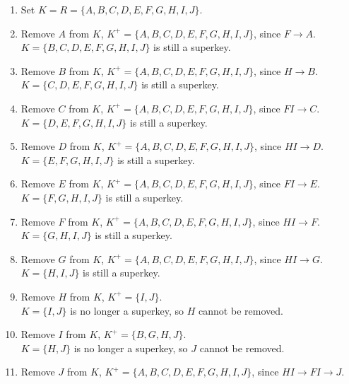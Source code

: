 \documentclass[12pt,letterpaper,titlepage,en-US]{article}
\begin{document}
\begin{homeworkProblem}
    \begin{homeworkSubProblem}
        \begin{enumerate}[label=\textbf{Step {\arabic*}}, leftmargin=2cm]
            \item Set $K = R = \{A,B,C,D,E,F,G,H,I,J\}$.
            \item Remove $A$ from $K$, $K^+ = \{A,B,C,D,E,F,G,H,I,J\}$, since $F \rightarrow A$.\\
                $K = \{B,C,D,E,F,G,H,I,J\}$ is still a superkey.
            \item Remove $B$ from $K$, $K^+ = \{A,B,C,D,E,F,G,H,I,J\}$, since $H \rightarrow B$.\\
                $K = \{C,D,E,F,G,H,I,J\}$ is still a superkey.
            \item Remove $C$ from $K$, $K^+ = \{A,B,C,D,E,F,G,H,I,J\}$, since $FI \rightarrow C$.\\
                $K = \{D,E,F,G,H,I,J\}$ is still a superkey.
            \item Remove $D$ from $K$, $K^+ = \{A,B,C,D,E,F,G,H,I,J\}$, since $HI \rightarrow D$.\\
                $K = \{E,F,G,H,I,J\}$ is still a superkey.
            \item Remove $E$ from $K$, $K^+ = \{A,B,C,D,E,F,G,H,I,J\}$, since $FI \rightarrow E$.\\
                $K = \{F,G,H,I,J\}$ is still a superkey.
            \item Remove $F$ from $K$, $K^+ = \{A,B,C,D,E,F,G,H,I,J\}$, since $HI \rightarrow F$.\\
                $K = \{G,H,I,J\}$ is still a superkey.
            \item Remove $G$ from $K$, $K^+ = \{A,B,C,D,E,F,G,H,I,J\}$, since $HI \rightarrow G$.\\
                $K = \{H,I,J\}$ is still a superkey.
            \item Remove $H$ from $K$, $K^+ = \{I,J\}$. \\
                $K = \{I,J\}$ is no longer a superkey, so $H$ cannot be removed.
            \item Remove $I$ from $K$, $K^+ = \{B,G,H,J\}$. \\
                $K = \{H,J\}$ is no longer a superkey, so $J$ cannot be removed.
            \item Remove $J$ from $K$, $K^+ = \{A,B,C,D,E,F,G,H,I,J\}$, since $HI \rightarrow FI \rightarrow J$.\\

\end{enumerate}
\end{homeworkSubProblem}
\end{homeworkProblem}
\end{document}
